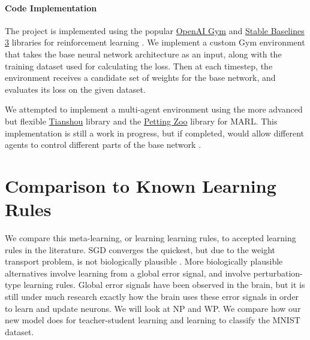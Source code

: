 \documentclass{article}
\begin{document}
\paragraph{Code Implementation} The project is implemented using the popular \href{https://www.gymlibrary.dev/}{OpenAI Gym} and \href{https://stable-baselines3.readthedocs.io/en/master/}{Stable Baselines 3} libraries for reinforcement learning \cite{openaigym, sb3}. We implement a custom Gym environment that takes the base neural network architecture as an input, along with the training dataset used for calculating the loss. Then at each timestep, the environment receives a candidate set of weights for the base network, and evaluates its loss on the given dataset.

We attempted to implement a multi-agent environment using the more advanced but flexible \href{https://github.com/thu-ml/tianshou}{Tianshou} library and the \href{https://pettingzoo.farama.org/}{Petting Zoo} library for MARL. This implementation is still a work in progress, but if completed, would allow different agents to control different parts of the base network \cite{tianshou, pettingzoo}.

\section{Comparison to Known Learning Rules}

We compare this meta-learning, or learning learning rules, to accepted learning rules in the literature. SGD converges the quickest, but due to the weight transport problem, is not biologically plausible \cite{mazzoni1991}. More biologically plausible alternatives involve learning from a global error signal, and involve perturbation-type learning rules. Global error signals have been observed in the brain, but it is still under much research exactly how the brain uses these error signals in order to learn and update neurons. We will look at NP and WP. We compare how our new model does for teacher-student learning and learning to classify the MNIST dataset.
\end{document}
